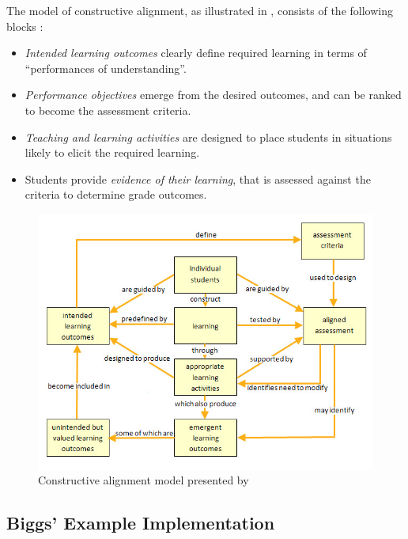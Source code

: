 The model of constructive alignment, as illustrated in , consists of the following blocks \cite{Houghton:2004}:
\begin{itemize}[noitemsep,nolistsep]
	\item \emph{Intended learning outcomes} clearly define required learning in terms of ``performances of understanding''.
	\item \emph{Performance objectives} emerge from the desired outcomes, and can be ranked to become the assessment criteria.
	\item \emph{Teaching and learning activities} are designed to place students in situations likely to elicit the required learning.
	\item Students provide \emph{evidence of their learning}, that is assessed against the criteria to determine grade outcomes.
\end{itemize}

\begin{figure}[htpb]
	\centering 
	\includegraphics[width=\columnwidth]{Houghton_constructive_alignment_1}
	\caption{Constructive alignment model presented by \citet{Houghton:2004}}
	\label{fig:Houghton}
\end{figure}



\subsection{Biggs' Example Implementation} %
\label{sub:biggs_example_implementation}

